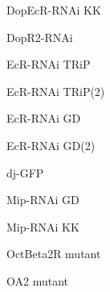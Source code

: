 \documentclass[17pt]{extarticle}
\begin{document}
\begin{normalsize}
DopEcR-RNAi KK \\[0.5em]
\end{normalsize}
\footnotesize
\newpage\vspace*{-0.15cm}
\begin{large}
DopR2-RNAi \\[0.5em]
\end{large}
\footnotesize
\newpage\vspace*{-0.15cm}
\begin{normalsize}
EcR-RNAi TRiP \\[0.5em]
\end{normalsize}
\footnotesize
\newpage\vspace*{-0.15cm}
\begin{footnotesize}
EcR-RNAi TRiP(2) \\[0.5em]
\end{footnotesize}
\footnotesize
\newpage\vspace*{-0.15cm}
\begin{normalsize}
EcR-RNAi GD \\[0.5em]
\end{normalsize}
\footnotesize
\newpage\vspace*{-0.15cm}
\begin{normalsize}
EcR-RNAi GD(2) \\[0.5em]
\end{normalsize}
\footnotesize
\newpage\vspace*{-0.15cm}
\begin{large}
dj-GFP \\[0.5em]
\end{large}
\footnotesize
\newpage\vspace*{-0.15cm}
\begin{normalsize}
Mip-RNAi GD \\[0.5em]
\end{normalsize}
\footnotesize
\newpage\vspace*{-0.15cm}
\begin{normalsize}
Mip-RNAi KK \\[0.5em]
\end{normalsize}
\footnotesize
\newpage\vspace*{-0.15cm}
\begin{footnotesize}
OctBeta2R mutant \\[0.5em]
\end{footnotesize}
\footnotesize
\newpage\vspace*{-0.15cm}
\begin{large}
OA2 mutant \\[0.5em]
\end{large}
\end{document}
